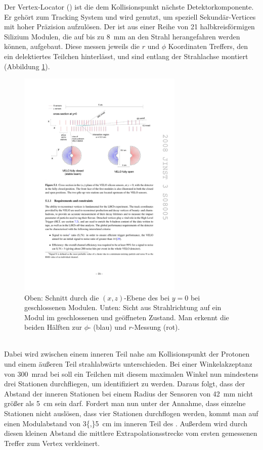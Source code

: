 Der Vertex-Locator (\velo) ist die dem Kollisionspunkt nächste Detektorkomponente. Er gehört zum Tracking System und wird genutzt, um speziell Sekundär-Vertices mit hoher Präzision aufzulösen. Der \velo ist aus einer Reihe von \num{21} halbkreisförmigen Silizium Modulen, die auf bis zu \SI{8}{mm} an den Strahl herangefahren werden können, aufgebaut. Diese messen jeweils die $r$ und $\phi$ Koordinaten Treffers, den ein delektiertes Teilchen hinterlässt, und sind entlang der Strahlachse montiert (Abbildung \ref{fig:velo}).  
\begin{figure}[htpb]
	\centering
		\includegraphics[width=0.7\textwidth]{fig/velo.pdf}
	\caption{Oben: Schnitt durch die $(x,z)$-Ebene des \velo bei $y=0$ bei geschlossenen Modulen. Unten: Sicht aus Strahlrichtung auf ein Modul im geschlossenen und geöffneten Zustand. Man erkennt die beiden Hälften zur $\phi$- (blau) und $r$-Messung (rot). \cite{Alves:2008zz}}
	\label{fig:velo} 
\end{figure} \\
Dabei wird zwischen einem inneren Teil nahe am Kollisionspunkt der Protonen und einem äußeren Teil strahlabwärts unterschieden. Bei einer Winkelakzeptanz von \SI{300}{mrad} bei \lhcb soll ein Teilchen mit diesem maximalen Winkel nun mindestens drei Stationen durchfliegen, um identifiziert zu werden. Daraus folgt, dass der Abstand der inneren Stationen bei einem Radius der Sensoren von \SI{42}{mm} nicht größer als \SI{5}{cm} sein darf. Fordert man nun unter der Annahme, dass einzelne Stationen nicht auslösen, dass vier Stationen durchflogen werden, kommt man auf einen Modulabstand von \SI{3{,}5}{cm} im inneren Teil des \velo. Außerdem wird durch diesen kleinen Abstand die mittlere Extrapolationsstrecke vom ersten gemessenen Treffer zum Vertex verkleinert.\\
